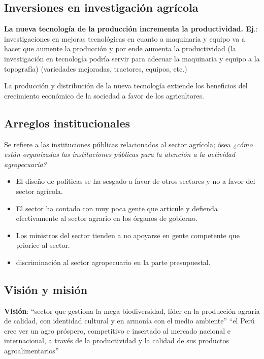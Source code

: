 \documentclass[
  a4paper,
]{article}
\begin{document}
\hypertarget{inversiones-en-investigaciuxf3n-agruxedcola}{%
\subsection{Inversiones en investigación
agrícola}\label{inversiones-en-investigaciuxf3n-agruxedcola}}

\textbf{La nueva tecnología de la producción incrementa la
productividad. Ej}.: investigaciones en mejoras tecnológicas en cuanto a
maquinaria y equipo va a hacer que aumente la producción y por ende
aumenta la productividad (la investigación en tecnología podría servir
para adecuar la maquinaria y equipo a la topografía) (variedades
mejoradas, tractores, equipos, etc.)

La producción y distribución de la nueva tecnología extiende los
beneficios del crecimiento económico de la sociedad a favor de los
agricultores.

\hypertarget{arreglos-institucionales}{%
\subsection{Arreglos institucionales}\label{arreglos-institucionales}}

Se refiere a las instituciones públicas relacionados al sector agrícola;
ósea \emph{¿cómo están organizadas las instituciones públicas para la
atención a la actividad agropecuaria?}

\begin{itemize}
\item
  El diseño de políticas se ha sesgado a favor de otros sectores y no a
  favor del sector agrícola.
\item
  El sector ha contado con muy poca gente que articule y defienda
  efectivamente al sector agrario en los órganos de gobierno.
\item
  Los ministros del sector tienden a no apoyarse en gente competente que
  priorice al sector.
\item
  discriminación al sector agropecuario en la parte presupuestal.
\end{itemize}

\hypertarget{visiuxf3n-y-misiuxf3n}{%
\subsection{Visión y misión}\label{visiuxf3n-y-misiuxf3n}}

\textbf{Visión}: ``sector que gestiona la mega biodiversidad, líder en
la producción agraria de calidad, con identidad cultural y en armonía
con el medio ambiente'' ``el Perú cree ver un agro próspero, competitivo
e insertado al mercado nacional e internacional, a través de la
productividad y la calidad de sus productos agroalimentarios''
\end{document}
